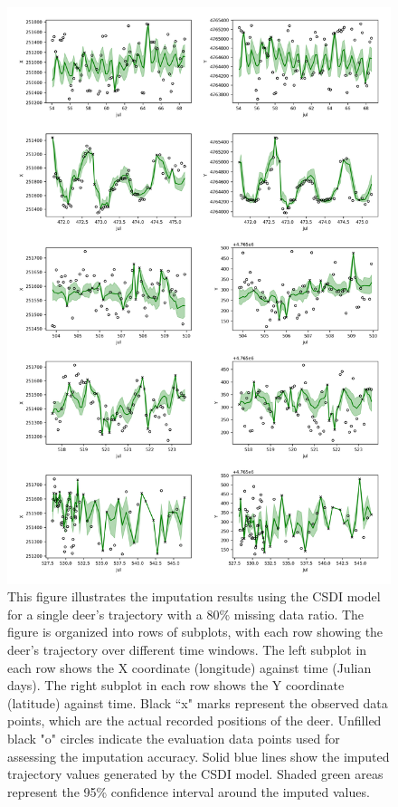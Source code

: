 \documentclass[11pt]{article}
\begin{document}
\begin{figure}[h]
  \centering
  \includegraphics[width=\textwidth]{../figure/80_5094_csdi} %
  \caption{This figure illustrates the imputation results using the CSDI model for a single deer's trajectory with a 80\% missing data ratio. The figure is organized into rows of subplots, with each row showing the deer's trajectory over different time windows. The left subplot in each row shows the X coordinate (longitude) against time (Julian days). The right subplot in each row shows the Y coordinate (latitude) against time. Black ``x" marks represent the observed data points, which are the actual recorded positions of the deer. Unfilled black "o" circles indicate the evaluation data points used for assessing the imputation accuracy. Solid blue lines show the imputed trajectory values generated by the CSDI model. Shaded green areas represent the 95\% confidence interval around the imputed values.}
  \label{fig: csdi_80} %
\end{figure}
\end{document}
